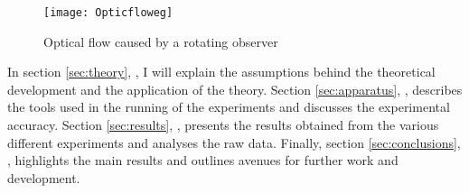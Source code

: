 \begin{figure}[htpb]
  \centering
  \texttt{[image: Opticfloweg]}
  \caption{Optical flow caused by a rotating observer~\cite{huston2008visuomotor}}
  \label{fig:opticalflow}
\end{figure}

In section \ref{sec:theory}, , I will explain the assumptions behind the theoretical development and the application of the theory. Section \ref{sec:apparatus}, , describes the tools used in the running of the experiments and discusses the experimental accuracy. Section \ref{sec:results}, , presents the results obtained from the various different experiments and analyses the raw data. Finally,  section \ref{sec:conclusions}, , highlights the main results and outlines avenues for further work and development.